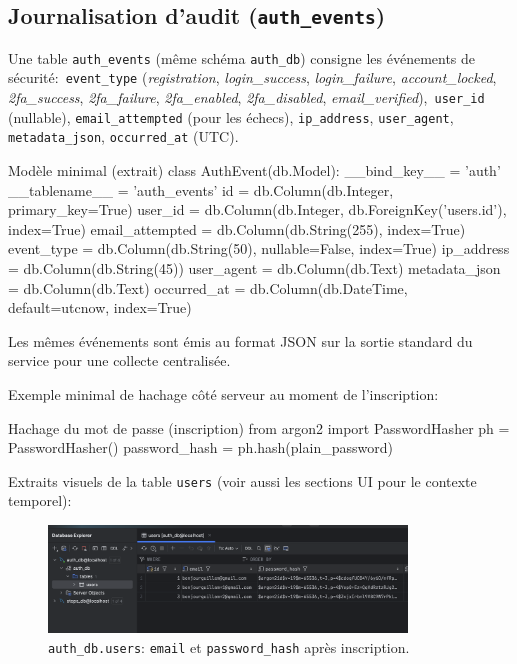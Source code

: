 \subsection*{Journalisation d'audit (\texttt{auth\_events})}
\noindent Une table \texttt{auth\_events} (même schéma \texttt{auth\_db}) consigne les événements de sécurité:\
\texttt{event\_type} (\textit{registration}, \textit{login\_success}, \textit{login\_failure}, \textit{account\_locked}, \textit{2fa\_success}, \textit{2fa\_failure}, \textit{2fa\_enabled}, \textit{2fa\_disabled}, \textit{email\_verified}),\
\texttt{user\_id} (nullable), \texttt{email\_attempted} (pour les échecs), \texttt{ip\_address}, \texttt{user\_agent}, \texttt{metadata\_json}, \texttt{occurred\_at} (UTC).

\begin{codebox}[language=Python]{Modèle minimal (extrait)}
class AuthEvent(db.Model):
    __bind_key__ = 'auth'
    __tablename__ = 'auth_events'
    id = db.Column(db.Integer, primary_key=True)
    user_id = db.Column(db.Integer, db.ForeignKey('users.id'), index=True)
    email_attempted = db.Column(db.String(255), index=True)
    event_type = db.Column(db.String(50), nullable=False, index=True)
    ip_address = db.Column(db.String(45))
    user_agent = db.Column(db.Text)
    metadata_json = db.Column(db.Text)
    occurred_at = db.Column(db.DateTime, default=utcnow, index=True)
\end{codebox}

\noindent Les mêmes événements sont émis au format JSON sur la sortie standard du service pour une collecte centralisée.

\vspace{0.5em}
\noindent Exemple minimal de hachage côté serveur au moment de l'inscription:
\begin{codebox}[language=Python]{Hachage du mot de passe (inscription)}
from argon2 import PasswordHasher
ph = PasswordHasher()
password_hash = ph.hash(plain_password)
\end{codebox}

\noindent Extraits visuels de la table \texttt{users} (voir aussi les sections UI pour le contexte temporel):
\begin{figure}[h]
  \centering
  \includegraphics[width=0.85\textwidth]{../figures/chap10/auth_db1.png}
  \caption{\texttt{auth\_db.users}: \texttt{email} et \texttt{password\_hash} après inscription.}
\end{figure}

